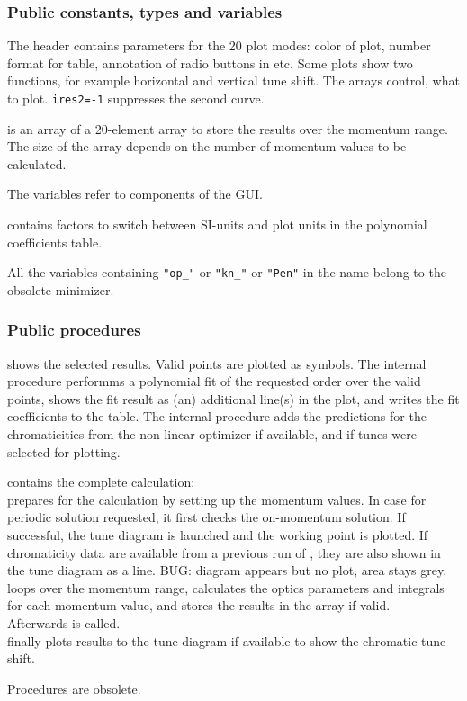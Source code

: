\documentclass[12pt]{article}
\newcommand\code[1]{{\tt #1}}
\newcommand\guico[1]{{\color{blue}\code{#1}}}
\newcommand{\unico}[1]{{\color{burntorange}\code{#1}}}
\newcommand{\opagui}[1]{\colorbox{blue!20}{{\color{black}\code{#1}}}}
\newcommand{\ogui}[1]{\hyperref[#1]{\opagui{#1}}}
\newcommand{\pvar}[1]{\subsubsection*{Public constants, types and variables} #1}
\newcommand{\ppro}[1]{\subsubsection*{Public procedures} #1}
\newcommand{\todo}[1]{{\color{red} #1}}
\begin{document}
\pvar{
The header contains parameters for the 20 plot modes: color of plot, number format for table, annotation of radio buttons in \ogui{opamomentum} etc. Some plots show two functions, for example horizontal and vertical tune shift. The arrays \unico{ires1,2} control, what to plot. \code{ires2=-1} suppresses the second curve.

\unico{result} is an array of a 20-element array to store the results over the momentum range. The size of the array depends on the number of momentum values to be calculated.

The \unico{...\_HANDLE} variables refer to components of the \guico{opamomentum} GUI.

\unico{res\_funit} contains factors to switch between SI-units and plot units in the polynomial coefficients table.


\todo{All the variables containing \code{"op\_"} or \code{"kn\_"} or \code{"Pen"} in the name belong to the obsolete minimizer.}
}

\ppro{
\unico{Makeplot} shows the selected results. Valid points are plotted as symbols. The internal procedure \unico{fit\_and\_plot} performms a polynomial fit of the requested order over the valid points, shows the fit result as (an) additional line(s) in the plot, and writes the fit coefficients to the table. The internal procedure \unico{plot\_qclines} adds the predictions for the chromaticities from the non-linear optimizer \guico{opachroma} if available, and if tunes were selected for plotting.

\unico{FullCalc} contains the complete calculation:\\
\unico{PreCalc} prepares for the calculation by setting up the momentum values. In case for periodic solution requested, it first checks the on-momentum solution. If successful, the tune diagram \ogui{opatunediag} is launched and the working point is plotted. If chromaticity data are available from a previous run of \guico{opachroma}, they are also shown in the tune diagram as a line. \todo{BUG: diagram appears but no plot, area  stays grey.}\\
\unico{Calculate} loops over the momentum range, calculates the optics parameters and integrals for each momentum value, and stores the results in the \unico{result} array if valid.\\
Afterwards \unico{MakePLot} is called.\\
\unico{PostCalc} finally plots results to the tune diagram if available to show the chromatic tune shift.

\todo{Procedures \unico{CalcPenalty, ShowPenalty, CalcTarg} are obsolete.}

}
\end{document}
